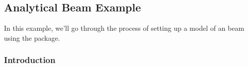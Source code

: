\documentclass[letterpaper,10pt,english]{sphinxmanual}
\begin{document}
\sphinxstepscope


\subsection{Analytical Beam Example}
\label{\detokenize{examples/analytical_beam:analytical-beam-example}}\label{\detokenize{examples/analytical_beam::doc}}
\sphinxAtStartPar
In this example, we’ll go through the process of setting up a model of an  beam using the  package.


\subsubsection{Introduction}
\label{\detokenize{examples/analytical_beam:introduction}}
\end{document}
